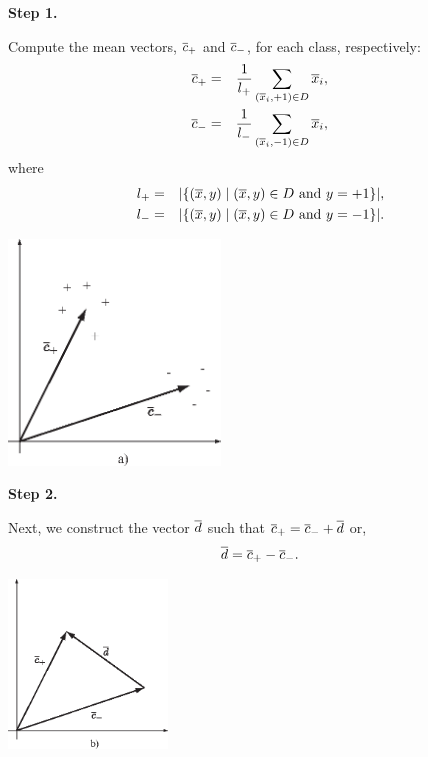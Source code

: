 \documentclass[a4paper,blends,pdf,colorBG,slideColor]{prosper}
\begin{document}
{\bf Step 1.}

Compute the mean vectors,  $\overline{c}_+$ and $\overline{c}_-$, for each class, respectively:
\begin{eqnarray*}
\overline{c}_+ & = & \frac{1}{l_+}\sum_{(\overline{x}_i,+1)\in D} \overline{x}_i,\\
\overline{c}_- & = & \frac{1}{l_-}\sum_{(\overline{x}_i,-1)\in D} \overline{x}_i,
\end{eqnarray*}
where 
\begin{eqnarray*}
l_+ &=& {|{\{(\overline{x},y) \mid (\overline{x},y) \in D \text{ and } y = +1\}}|},\\
l_- &=& {|{\{(\overline{x},y) \mid (\overline{x},y) \in D \text{ and } y = -1\}}|}.
\end{eqnarray*}
\es




\begin{center}
\includegraphics[height=60mm]{figures/simple-a.eps}
\end{center}
\es


{\bf Step 2.}

Next, we construct the vector $\overline{d}$ such that $\overline{c}_+ = \overline{c}_- + \overline{d}$ or,
\begin{equation*}
\overline{d} = \overline{c}_+ -\overline{c}_- .
\end{equation*}

\vspace{.2in}

\begin{center}
\includegraphics[height=45mm]{figures/simple-b.eps}
\end{center}
\es
\end{document}
